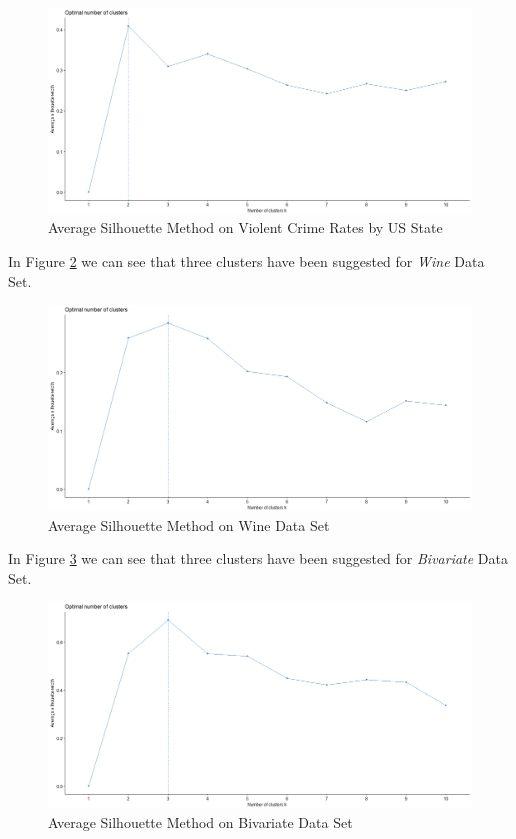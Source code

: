 \begin{itemize}
\begin{figure}[h!]
  \centering
  \includegraphics[scale=1.3]{figures/results/USArrests/silhouette.png}
  \caption{Average Silhouette Method on Violent Crime Rates by US State}
  \label{fig:silhoutte5}
\end{figure}

\vspace{15mm}

In Figure \ref{fig:silhoutte6} we can see that three clusters have been suggested for \textit{Wine} Data Set.

\begin{figure}[h!]
  \centering
  \includegraphics[scale=1.3]{figures/results/wine/silhouette.png}
  \caption{Average Silhouette Method on Wine Data Set}
  \label{fig:silhoutte6}
\end{figure}

\newpage

In Figure \ref{fig:silhoutte7} we can see that three clusters have been suggested for \textit{Bivariate} Data Set.

\begin{figure}[h!]
  \centering
  \includegraphics[scale=1.3]{figures/results/xclara/silhouette.png}
  \caption{Average Silhouette Method on Bivariate Data Set}
  \label{fig:silhoutte7}
\end{figure}


\end{itemize}
